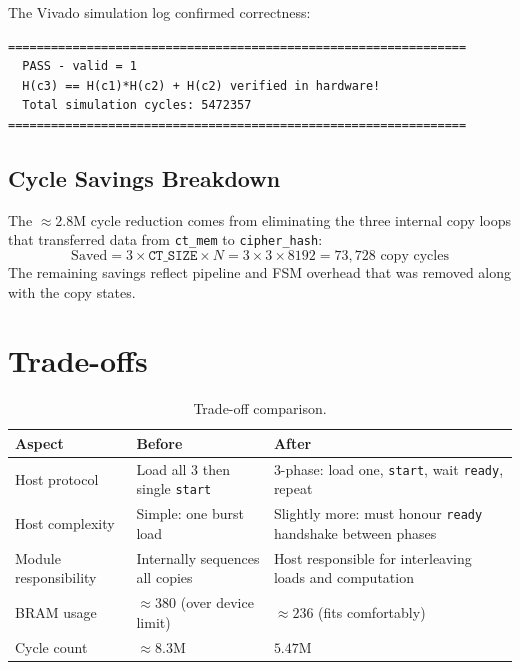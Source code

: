 \documentclass[12pt, a4paper]{article}
\begin{document}
The Vivado simulation log confirmed correctness:

\begin{verbatim}
================================================================
  PASS - valid = 1
  H(c3) == H(c1)*H(c2) + H(c2) verified in hardware!
  Total simulation cycles: 5472357
================================================================
\end{verbatim}

\subsection{Cycle Savings Breakdown}

The $\approx 2.8$M cycle reduction comes from eliminating the three
internal copy loops that transferred data from \texttt{ct\_mem} to
\texttt{cipher\_hash}:
\[
  \text{Saved} = 3 \times \texttt{CT\_SIZE} \times N
               = 3 \times 3 \times 8192 = 73{,}728 \text{ copy cycles}
\]
The remaining savings reflect pipeline and FSM overhead that was
removed along with the copy states.

\section{Trade-offs}
\label{sec:tradeoffs}

\begin{table}[h]
\centering
\begin{tabular}{p{5cm} p{4.5cm} p{4.5cm}}
\toprule
\textbf{Aspect} & \textbf{Before} & \textbf{After} \\
\midrule
Host protocol & Load all 3 then single \texttt{start} &
  3-phase: load one, \texttt{start}, wait \texttt{ready}, repeat \\
\midrule
Host complexity & Simple: one burst load & Slightly more: must honour
  \texttt{ready} handshake between phases \\
\midrule
Module responsibility & Internally sequences all copies &
  Host responsible for interleaving loads and computation \\
\midrule
BRAM usage & $\approx 380$ (over device limit) & $\approx 236$
  (fits comfortably) \\
\midrule
Cycle count & $\approx 8.3$M & $5.47$M \\
\bottomrule
\end{tabular}
\caption{Trade-off comparison.}
\label{tab:tradeoffs}
\end{table}
\end{document}
